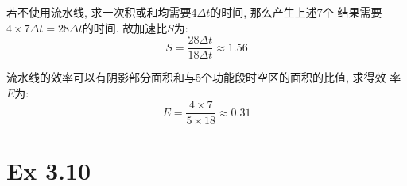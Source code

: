 \begin{solve}
  若不使用流水线, 求一次积或和均需要$4\Delta{}t$的时间, 那么产生上述7个
  结果需要$4\times{}7\Delta{}t = 28\Delta{}t$的时间. 故加速比$S$为:
  \begin{displaymath}
    S = \frac{28\Delta{}t}{18\Delta{}t} \approx 1.56
  \end{displaymath}

  流水线的效率可以有阴影部分面积和与5个功能段时空区的面积的比值, 求得效
  率$E$为:
  \begin{displaymath}
    E = \frac{4\times{}7}{5\times{}18} \approx 0.31
  \end{displaymath}
\end{solve}

\section{Ex 3.10}

